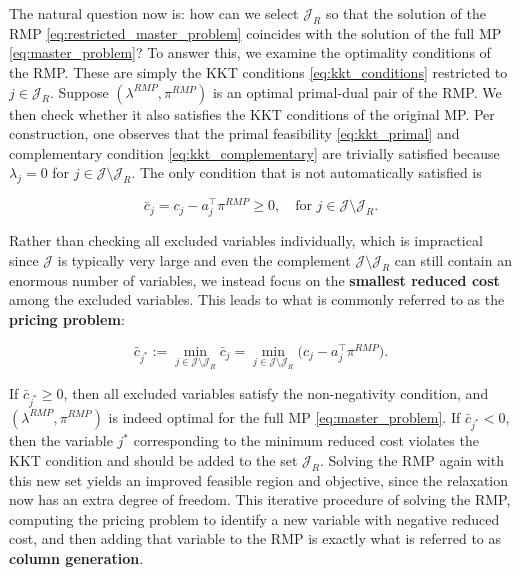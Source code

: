 \documentclass{book}
\theoremstyle{definition}
\numberwithin{algorithm_}{chapter}
\begin{document}
The natural question now is: how can we select $\mathcal{J}_R$ so that the solution of the RMP \eqref{eq:restricted_master_problem} coincides with the solution of the full MP \eqref{eq:master_problem}?  
To answer this, we examine the optimality conditions of the RMP.  
These are simply the KKT conditions \eqref{eq:kkt_conditions} restricted to $j \in \mathcal{J}_R$.  
Suppose $(\lambda^{RMP}, \pi^{RMP})$ is an optimal primal-dual pair of the RMP.  
We then check whether it also satisfies the KKT conditions of the original MP. Per construction, one observes that the primal feasibility \eqref{eq:kkt_primal} and complementary condition \eqref{eq:kkt_complementary} are trivially satisfied because $\lambda_j = 0$ for $j \in \mathcal{J} \setminus \mathcal{J}_R$. The only condition that is not automatically satisfied is

\begin{equation*}
	\bar{c}_j = c_j - a_j^\top \pi^{RMP} \ge 0, \quad \text{for } j \in \mathcal{J} \setminus \mathcal{J}_R. 
\end{equation*}

Rather than checking all excluded variables individually, which is impractical since $\mathcal{J}$ is typically very large and even the complement $\mathcal{J} \setminus \mathcal{J}_R$ can still contain an enormous number of variables, we instead focus on the \textbf{smallest reduced cost} among the excluded variables.  
This leads to what is commonly referred to as the \textbf{pricing problem}:

\begin{equation}\label{eq:pricing_problem}
\bar{c}_{j^*} := \min_{j \in \mathcal{J} \setminus \mathcal{J}_R} \bar{c}_j = \min_{j \in \mathcal{J} \setminus \mathcal{J}_R} \big( c_j - a_j^\top \pi^{RMP} \big).
\end{equation}

If $\bar{c}_{j^*} \ge 0$, then all excluded variables satisfy the non-negativity condition, and $(\lambda^{RMP}, \pi^{RMP})$ is indeed optimal for the full MP \eqref{eq:master_problem}.  
If $\bar{c}_{j^*} < 0$, then the variable $j^*$ corresponding to the minimum reduced cost violates the KKT condition and should be added to the set $\mathcal{J}_R$. Solving the RMP again with this new set yields an improved feasible region and objective, since the relaxation now has an extra degree of freedom. This iterative procedure of solving the RMP, computing the pricing problem to identify a new variable with negative reduced cost, and then adding that variable to the RMP is exactly what is referred to as \textbf{column generation}.
\end{document}
